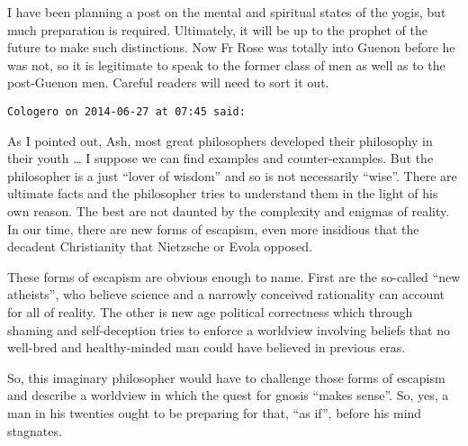 \begin{footnotesize}
\begin{sffamily}
I have been planning a post on the mental and spiritual states of the yogis, but much preparation is required.
Ultimately, it will be up to the prophet of the future to make such distinctions. Now Fr Rose was totally into Guenon
before he was not, so it is legitimate to speak to the former class of men as well as to the post-Guenon men. Careful
readers will need to sort it out.

\hfill

\texttt{Cologero on 2014-06-27 at 07:45 said: }

As I pointed out, Ash, most great philosophers developed their philosophy in their youth … I suppose we can find
examples and counter-examples. But the philosopher is a just “lover of wisdom” and so is not necessarily “wise”. There
are ultimate facts and the philosopher tries to understand them in the light of his own reason. The best are not
daunted by the complexity and enigmas of reality. In our time, there are new forms of escapism, even more insidious
that the decadent Christianity that Nietzsche or Evola opposed.

These forms of escapism are obvious enough to name. First are the so-called “new atheists”, who believe science and a
narrowly conceived rationality can account for all of reality. The other is new age political correctness which through
shaming and self-deception tries to enforce a worldview involving beliefs that no well-bred and healthy-minded man
could have believed in previous eras.

So, this imaginary philosopher would have to challenge those forms of escapism and describe a worldview in which the
quest for gnosis “makes sense”. So, yes, a man in his twenties ought to be preparing for that, “as if”, before his mind
stagnates.

\hfill
\end{sffamily}\end{footnotesize}